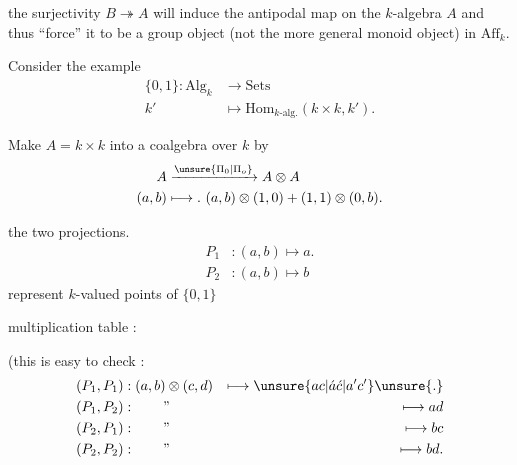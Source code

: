
the surjectivity $B\twoheadrightarrow A$ will induce the antipodal map on the $k$-algebra $A$ and thus ``force'' it to be a group object (not the more general monoid object) in $\mathrm{Aff}_k$.

Consider the example
\[
\begin{aligned}
\{0,1\}: \mathrm{Alg}_k&\longrightarrow\mathrm{Sets}\\
k'&\longmapsto\mathrm{Hom}_{k\text{-alg}.}(k\times k,k').
\end{aligned}
\]

Make $A=k\times k$ into a coalgebra over $k$ by
\[
\begin{aligned}
 A&\xrightarrow{\unsure{\Pi_0|\Pi_o}}A\otimes A\\
 (a,b)&\longmapsto.\ (a,b)\otimes(1,0)+(1,1)\otimes(0,b).
\end{aligned}
\]

the two projections.
\[
\begin{aligned}
P_1 &: (a,b)\longmapsto a.\\
P_2 &: (a,b)\longmapsto b
\end{aligned}
\]
represent $k$-valued points of $\{0,1\}$

multiplication table :

(this is easy to check :
\[
\begin{aligned}
(P_1,P_1)&:(a,b)\otimes(c,d)&\longmapsto\unsure{ac|\acute a\acute c|a'c'}\unsure{.}\\
(P_1,P_2)&:\qquad\text{\rq\rq}&\longmapsto ad\\
(P_2,P_1)&:\qquad\text{\rq\rq}&\longmapsto bc\\
(P_2,P_2)&:\qquad\text{\rq\rq}&\longmapsto bd.
\end{aligned}
\]
\clearpage
